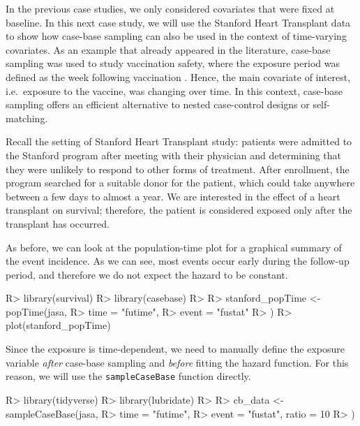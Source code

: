 \documentclass[
]{jss}
\begin{document}
In the previous case studies, we only considered covariates that were
fixed at baseline. In this next case study, we will use the Stanford
Heart Transplant data
\citep[\citet{crowley1977covariance}]{clark1971cardiac} to show how
case-base sampling can also be used in the context of time-varying
covariates. As an example that already appeared in the literature,
case-base sampling was used to study vaccination safety, where the
exposure period was defined as the week following vaccination
\citep{saarela2015case}. Hence, the main covariate of interest,
i.e.~exposure to the vaccine, was changing over time. In this context,
case-base sampling offers an efficient alternative to nested
case-control designs or self-matching.

Recall the setting of Stanford Heart Transplant study: patients were
admitted to the Stanford program after meeting with their physician and
determining that they were unlikely to respond to other forms of
treatment. After enrollment, the program searched for a suitable donor
for the patient, which could take anywhere between a few days to almost
a year. We are interested in the effect of a heart transplant on
survival; therefore, the patient is considered exposed only after the
transplant has occurred.

As before, we can look at the population-time plot for a graphical
summary of the event incidence. As we can see, most events occur early
during the follow-up period, and therefore we do not expect the hazard
to be constant.

\begin{CodeChunk}

\begin{CodeInput}
R> library(survival)
R> library(casebase)
R> 
R> stanford_popTime <- popTime(jasa,
R>   time = "futime",
R>   event = "fustat"
R> )
R> plot(stanford_popTime)
\end{CodeInput}
\end{CodeChunk}

Since the exposure is time-dependent, we need to manually define the
exposure variable \emph{after} case-base sampling and \emph{before}
fitting the hazard function. For this reason, we will use the
\texttt{sampleCaseBase} function directly.

\begin{CodeChunk}

\begin{CodeInput}
R> library(tidyverse)
R> library(lubridate)
R> 
R> cb_data <- sampleCaseBase(jasa,
R>   time = "futime",
R>   event = "fustat", ratio = 10
R> )
\end{CodeInput}
\end{CodeChunk}
\end{document}
